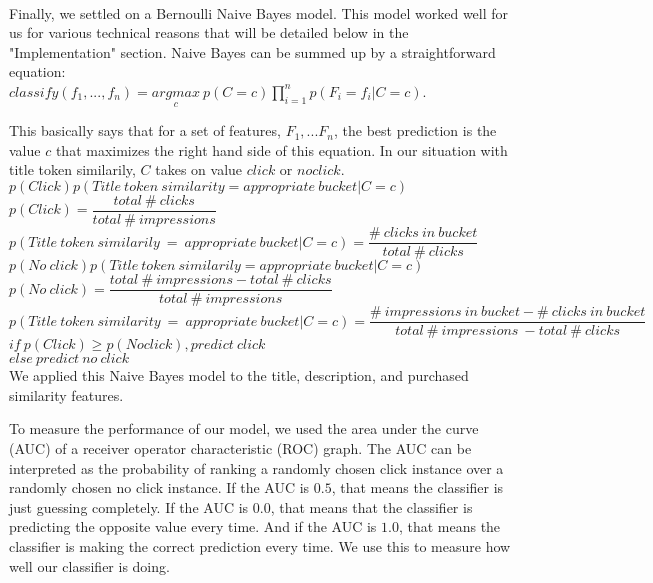 \documentclass[11pt]{article}
\begin{document}
\paragraph{}
Finally, we settled on a Bernoulli Naive Bayes model. This model worked well for us for various technical reasons that will be detailed below in the "Implementation" section. Naive Bayes can be summed up by a straightforward equation: \\

$\displaystyle classify(f_1,...,f_n) = \underset{c}{argmax}\ p(C = c) \prod_{i=1}^n p(F_i = f_i|C = c)$. 

This basically says that for a set of features, $F_1,...F_n$, the best prediction is the value $c$ that maximizes the right hand side of this equation. In our situation with title token similarily, $C$ takes on value $click$ or $no click$. \\

$p(Click) p(Title\ token\ similarity = appropriate\ bucket|C = c)$ \\
$p(Click) = \dfrac{total\ \#\ clicks}{total\ \#\ impressions}$ \\
$p(Title\ token\ similarily\ =\ appropriate\ bucket|C = c) = \dfrac{\#\ clicks\ in\ bucket}{total\ \#\ clicks}$ \\

$p(No\ click) p(Title\ token\ similarily = appropriate\ bucket|C = c)$ \\
$p(No\ click) = \dfrac{total\ \#\ impressions - total\ \#\ clicks}{total\ \#\ impressions}$ \\
$p(Title\ token\ similarity\ =\ appropriate\ bucket|C = c) = \dfrac{\#\ impressions\ in\ bucket - \#\ clicks\ in\ bucket}{total\ \#\ impressions\ - total\ \#\ clicks}$ \\

$if\ p(Click) \ge p(No click), predict\ click$ \\
$else\ predict\ no\ click$ \\

We applied this Naive Bayes model to the title, description, and purchased similarity features.

To measure the performance of our model, we used the area under the curve (AUC) of a receiver operator characteristic (ROC) graph. The AUC can be interpreted as the probability of ranking a randomly chosen click instance over a randomly chosen no click instance. If the AUC is $0.5$, that means the classifier is just guessing completely. If the AUC is $0.0$, that means that the classifier is predicting the opposite value every time. And if the AUC is $1.0$, that means the classifier is making the correct prediction every time. We use this to measure how well our classifier is doing.
\end{document}
